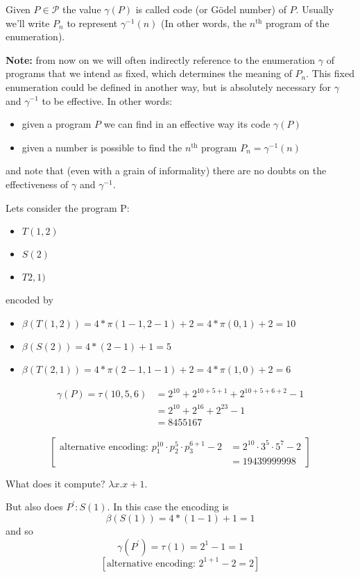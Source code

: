 \begin{definition}
  Given $P \in \mathcal{P}$ the value $\gamma(P)$ is called code (or
  Gödel number) of $P$. Usually we'll write $P_n$ to represent
  $\gamma^{-1}(n)$ (In other words, the $n^{\mbox{th}}$ program of the
  enumeration).
\end{definition}

\textbf{Note:} from now on we will often indirectly reference to the
enumeration $\gamma$ of programs that we intend as fixed, which
determines the meaning of $P_n$. This fixed enumeration could be
defined in another way, but is absolutely necessary for $\gamma$ and
$\gamma^{-1}$ to be effective. In other words:
\begin{itemize}
\item given a program $P$ we can find in an effective way its code
  $\gamma(P)$
\item given a number is possible to find the $n^{\mbox{th}}$ program
  $P_n = \gamma^{-1}(n)$
\end{itemize}

and note that (even with a grain of informality) there are no doubts
on the effectiveness of $\gamma$ and $\gamma^{-1}$.

\begin{example}
  Lets consider the program P:
  \begin{itemize}
  \item[] $T(1,2)$
  \item[] $S(2)$
  \item[] $T2,1)$
  \end{itemize}
  encoded by

  \begin{itemize}
  \item[] $\beta(T(1,2)) = 4 * \pi(1-1,2-1) + 2 = 4 * \pi(0,1) + 2 = 10$
  \item[] $\beta(S(2)) = 4 * (2-1) + 1 = 5$
  \item[] $\beta(T(2,1)) = 4 * \pi(2-1,1-1) + 2 = 4 * \pi(1,0) + 2 = 6$
  \end{itemize}

  \[\begin{split}
      \gamma(P) = \tau(10,5,6) & = 2^{10} + 2^{10+5+1} + 2^{10+5+6+2} - 1 \\
      & = 2^{10} + 2^{16} + 2^{23} - 1 \\
      & = 8455167
    \end{split}
  \]

  \[
    \left[
      \begin{split}
        \mbox{alternative encoding: } p_1^{10} \cdot p_2^5 \cdot p_3^{6+1} - 2 & = 2^{10} \cdot 3^5 \cdot 5^7 -2 \\
        & = 19439999998
      \end{split}
    \right]
  \]

  What does it compute? $\lambda x . x+1$.

  But also does $P^\prime : S(1)$. In this case the encoding is
  \[\beta(S(1)) = 4 * (1-1) + 1 = 1\] and so
  \[\gamma(P^\prime) = \tau(1) = 2^1 - 1 = 1\]
  \[\left[ \mbox{alternative encoding: } 2^{1+1} - 2 = 2 \right] \]
\end{example}


